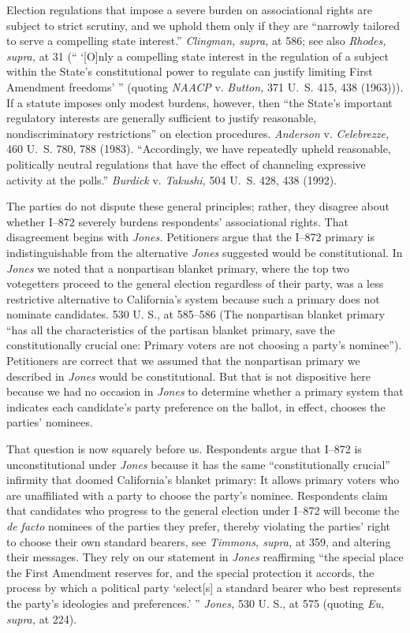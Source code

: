   Election regulations that impose a severe burden on associational
rights are subject to strict scrutiny, and we uphold them only if they
are ``narrowly tailored to serve a compelling state interest.''
\emph{Clingman, supra,} at 586; see also \emph{Rhodes, supra,} at 31
(`` ‘[O]nly a compelling state interest in the regulation of a
subject within the State's constitutional power to regulate can
justify limiting First Amendment \newpage  freedoms' '' (quoting
\emph{NAACP} v. \emph{Button,} 371 U.~S. 415, 438 (1963))). If a statute
imposes only modest burdens, however, then ``the State's important
regulatory interests are generally sufficient to justify reasonable,
nondiscriminatory restrictions'' on election procedures. \emph{Anderson}
v. \emph{Celebrezze,} 460 U.~S. 780, 788 (1983). ``Accordingly, we
have repeatedly upheld reasonable, politically neutral regulations that
have the effect of channeling expressive activity at the polls.''
\emph{Burdick} v. \emph{Takushi,} 504 U.~S. 428, 438 (1992).

  The parties do not dispute these general principles; rather, they
disagree about whether I--872 severely burdens respondents'
associational rights. That disagreement begins with \emph{Jones.}
Petitioners argue that the I--872 primary is indistinguishable from the
alternative \emph{Jones} suggested would be constitutional. In \emph{Jones} we
noted that a nonpartisan blanket primary, where the top two votegetters
proceed to the general election regardless of their party, was a less
restrictive alternative to California's system because such a primary
does not nominate candidates. 530 U. S., at 585--586 (The nonpartisan
blanket primary ``has all the characteristics of the partisan blanket
primary, save the constitutionally crucial one: Primary voters are not
choosing a party's nominee''). Petitioners are correct that we
assumed that the nonpartisan primary we described in \emph{Jones} would
be constitutional. But that is not dispositive here because we had
no occasion in \emph{Jones} to determine whether a primary system that
indicates each candidate's party preference on the ballot, in effect,
chooses the parties' nominees.

  That question is now squarely before us. Respondents argue that
I--872 is unconstitutional under \emph{Jones} because it has the same
``constitutionally crucial'' infirmity that doomed California's
blanket primary: It allows primary voters who are unaffiliated with a
party to choose the party's nominee. Respondents claim that candidates
who progress to the general election under I--872 will become the
\emph{de facto} nominees \newpage  of the parties they prefer, thereby
violating the parties' right to choose their own standard bearers,
see \emph{Timmons, supra,} at 359, and altering their messages. They
rely on our statement in \emph{Jones} reaffirming ``the special place the
First Amendment reserves for, and the special protection it accords,
the process by which a political party ‘select[s] a standard bearer
who best represents the party's ideologies and preferences.' ''
\emph{Jones,} 530 U. S., at 575 (quoting \emph{Eu, supra,} at 224).

